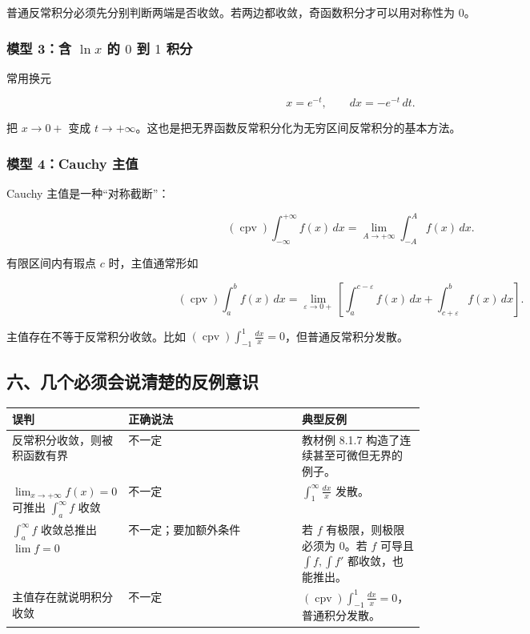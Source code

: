 普通反常积分必须先分别判断两端是否收敛。若两边都收敛，奇函数积分才可以用对称性为 \(0\)。

\subsubsection*{模型 3：含 \(\ln x\) 的 \(0\) 到 \(1\) 积分}

常用换元

\[
      x=e^{-t},\qquad dx=-e^{-t}\,dt.
    \]

把 \(x\to0+\) 变成 \(t\to+\infty\)。这也是把无界函数反常积分化为无穷区间反常积分的基本方法。

\subsubsection*{模型 4：Cauchy 主值}

Cauchy 主值是一种“对称截断”：

\[
      (\operatorname{cpv})\int_{-\infty}^{+\infty}f(x)\,dx
      =
      \lim_{A\to+\infty}\int_{-A}^{A}f(x)\,dx.
    \]

有限区间内有瑕点 \(c\) 时，主值通常形如

\[
      (\operatorname{cpv})\int_a^b f(x)\,dx
      =
      \lim_{\varepsilon\to0+}
      \left[
        \int_a^{c-\varepsilon}f(x)\,dx+
        \int_{c+\varepsilon}^{b}f(x)\,dx
      \right].
    \]

\begin{notebox}
主值存在不等于反常积分收敛。比如 \((\operatorname{cpv})\int_{-1}^1\frac{dx}{x}=0\)，但普通反常积分发散。
\end{notebox}

\subsection*{六、几个必须会说清楚的反例意识}

\begin{center}
\small
\begin{tabularx}{\linewidth}{|>{\raggedright\arraybackslash}p{0.18\linewidth}|>{\raggedright\arraybackslash}p{0.42\linewidth}|>{\raggedright\arraybackslash}X|}
\hline
\textbf{误判} & \textbf{正确说法} & \textbf{典型反例} \\ \hline
反常积分收敛，则被积函数有界 & 不一定 & 教材例 8.1.7 构造了连续甚至可微但无界的例子。 \\ \hline
\(\lim_{x\to+\infty}f(x)=0\) 可推出 \(\int_a^\infty f\) 收敛 & 不一定 & \(\int_1^\infty \frac{dx}{x}\) 发散。 \\ \hline
\(\int_a^\infty f\) 收敛总推出 \(\lim f=0\) & 不一定；要加额外条件 & 若 \(f\) 有极限，则极限必须为 \(0\)。若 \(f\) 可导且 \(\int f,\int f'\) 都收敛，也能推出。 \\ \hline
主值存在就说明积分收敛 & 不一定 & \((\operatorname{cpv})\int_{-1}^1\frac{dx}{x}=0\)，普通积分发散。 \\ \hline
\end{tabularx}
\end{center}


